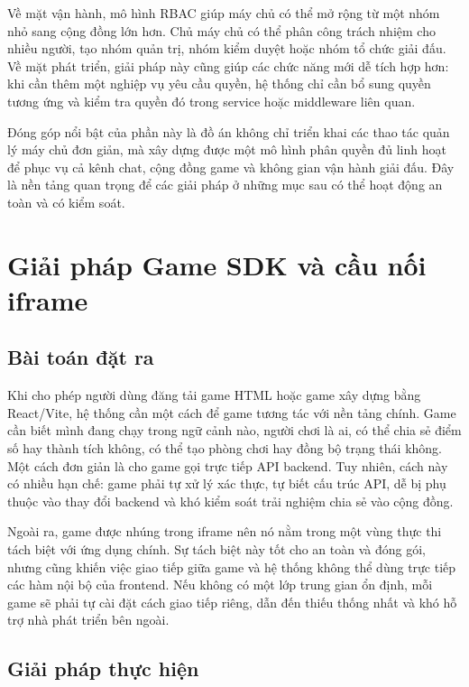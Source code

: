 \documentclass[../DoAn.tex]{subfiles}
\begin{document}
Về mặt vận hành, mô hình RBAC giúp máy chủ có thể mở rộng từ một nhóm nhỏ sang cộng đồng lớn hơn. Chủ máy chủ có thể phân công trách nhiệm cho nhiều người, tạo nhóm quản trị, nhóm kiểm duyệt hoặc nhóm tổ chức giải đấu. Về mặt phát triển, giải pháp này cũng giúp các chức năng mới dễ tích hợp hơn: khi cần thêm một nghiệp vụ yêu cầu quyền, hệ thống chỉ cần bổ sung quyền tương ứng và kiểm tra quyền đó trong service hoặc middleware liên quan.

Đóng góp nổi bật của phần này là đồ án không chỉ triển khai các thao tác quản lý máy chủ đơn giản, mà xây dựng được một mô hình phân quyền đủ linh hoạt để phục vụ cả kênh chat, cộng đồng game và không gian vận hành giải đấu. Đây là nền tảng quan trọng để các giải pháp ở những mục sau có thể hoạt động an toàn và có kiểm soát.

\section{Giải pháp Game SDK và cầu nối iframe}
\label{section:5.2}

\subsection{Bài toán đặt ra}
\label{subsection:5.2.1}

Khi cho phép người dùng đăng tải game HTML hoặc game xây dựng bằng React/Vite, hệ thống cần một cách để game tương tác với nền tảng chính. Game cần biết mình đang chạy trong ngữ cảnh nào, người chơi là ai, có thể chia sẻ điểm số hay thành tích không, có thể tạo phòng chơi hay đồng bộ trạng thái không. Một cách đơn giản là cho game gọi trực tiếp API backend. Tuy nhiên, cách này có nhiều hạn chế: game phải tự xử lý xác thực, tự biết cấu trúc API, dễ bị phụ thuộc vào thay đổi backend và khó kiểm soát trải nghiệm chia sẻ vào cộng đồng.

Ngoài ra, game được nhúng trong iframe nên nó nằm trong một vùng thực thi tách biệt với ứng dụng chính. Sự tách biệt này tốt cho an toàn và đóng gói, nhưng cũng khiến việc giao tiếp giữa game và hệ thống không thể dùng trực tiếp các hàm nội bộ của frontend. Nếu không có một lớp trung gian ổn định, mỗi game sẽ phải tự cài đặt cách giao tiếp riêng, dẫn đến thiếu thống nhất và khó hỗ trợ nhà phát triển bên ngoài.

\subsection{Giải pháp thực hiện}
\label{subsection:5.2.2}
\end{document}
